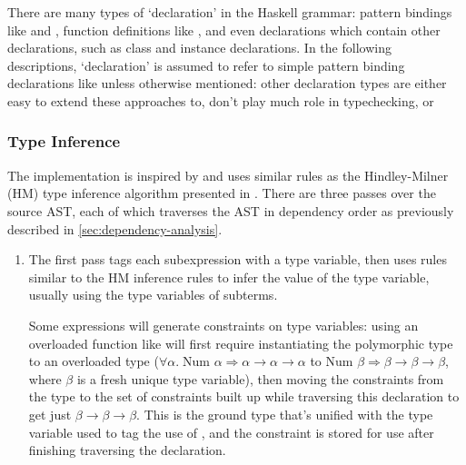 \documentclass[dissertation.tex]{subfiles}
\begin{document}
{{        

        There are many types of `declaration' in the Haskell grammar: pattern bindings like  and
        , function definitions like , and even declarations
        which contain other declarations, such as class and instance declarations. In the following descriptions,
        `declaration' is assumed to refer to simple pattern binding declarations like  unless otherwise
        mentioned: other declaration types are either easy to extend these approaches to, don't play much role in
        typechecking, or 


        \subsubsection{Type Inference}
        {

            The implementation is inspired by \cite{THIH} and uses similar rules as the Hindley-Milner (HM) type
            inference algorithm presented in \cite{HM-rules}. There are three passes over the source AST, each of which
            traverses the AST in dependency order as previously described in \ref{sec:dependency-analysis}.

            \begin{enumerate}
            \item
            {
                
                The first pass tags each subexpression with a type variable, then uses rules similar to the HM inference
                rules to infer the value of the type variable, usually using the type variables of subterms.
                
                Some expressions will generate constraints on type variables: using an overloaded function like
                \haskell{(+)} will first require instantiating the polymorphic type to an overloaded type
                (\(\forall\alpha.\;\text{Num }\alpha\Rightarrow\alpha\rightarrow\alpha\rightarrow\alpha\) to \(\text{Num
                }\beta\Rightarrow\beta\rightarrow\beta\rightarrow\beta\), where \(\beta\) is a fresh unique type
                variable), then moving the constraints from the type to the set of constraints built up while traversing
                this declaration to get just \(\beta\rightarrow\beta\rightarrow\beta\). This is the ground type that's
                unified with the type variable used to tag the use of \haskell{(+)}, and the constraint is stored for
                use after finishing traversing the declaration.

}
\end{enumerate}}}}
\end{document}
